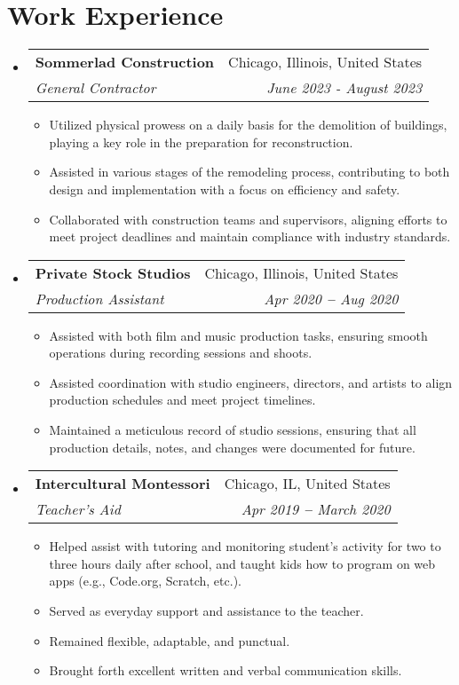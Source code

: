 \documentclass[letterpaper,11pt]{article}
\makeatletter
\newcommand{\resumeItem}[1]{
  \item\small{
    {#1 \vspace{-2pt}}
  }
}
\newcommand{\resumeSubheading}[4]{
  \vspace{-2pt}\item
    \begin{tabular*}{0.97\textwidth}[t]{l@{\extracolsep{\fill}}r}
      \textbf{#1} & #2 \\
      \textit{\small#3} & \textit{\small #4} \\
    \end{tabular*}\vspace{-7pt}
}
\newcommand{\resumeSubHeadingListStart}{\begin{itemize}[leftmargin=0.15in, label={}]}
\newcommand{\resumeSubHeadingListEnd}{\end{itemize}}
\newcommand{\resumeItemListStart}{\begin{itemize}}
\newcommand{\resumeItemListEnd}{\end{itemize}\vspace{-5pt}}
\makeatother
\begin{document}

\section{Work Experience}
  \vspace{3pt}
  \resumeSubHeadingListStart
  
    \resumeSubheading
      {Sommerlad Construction}{Chicago, Illinois, United States}
      {General Contractor}{June 2023 - August 2023}
        \resumeItemListStart
            \resumeItem{Utilized physical prowess on a daily basis for the demolition of buildings, playing a key role in the preparation for reconstruction.}
            \resumeItem{Assisted in various stages of the remodeling process, contributing to both design and implementation with a focus on efficiency and safety.}
            \resumeItem{Collaborated with construction teams and supervisors, aligning efforts to meet project deadlines and maintain compliance with industry standards.}
        \resumeItemListEnd

    \resumeSubheading
      {Private Stock Studios}{Chicago, Illinois, United States}
      {Production Assistant}{Apr 2020 \textbf{--} Aug 2020}
        \resumeItemListStart
	            \resumeItem{Assisted with both film and music production tasks, ensuring smooth operations during recording sessions and shoots.}
\resumeItem{Assisted coordination with studio engineers, directors, and artists to align production schedules and meet project timelines.}
\resumeItem{Maintained a meticulous record of studio sessions, ensuring that all production details, notes, and changes were documented for future.}
        \resumeItemListEnd
        
\resumeSubheading
   {Intercultural Montessori}{Chicago, IL, United States}
   {Teacher's Aid}{Apr 2019 \textbf{--} March 2020}
     \resumeItemListStart
        \resumeItem{Helped assist with tutoring and monitoring student's activity for two to three hours daily after school, and taught kids how to program on web apps (e.g., Code.org, Scratch, etc.).}
        \resumeItem{Served as everyday support and assistance to the teacher.}
        \resumeItem{Remained flexible, adaptable, and punctual.}
        \resumeItem{Brought forth excellent written and verbal communication skills.}
     \resumeItemListEnd

  \resumeSubHeadingListEnd



\end{document}
